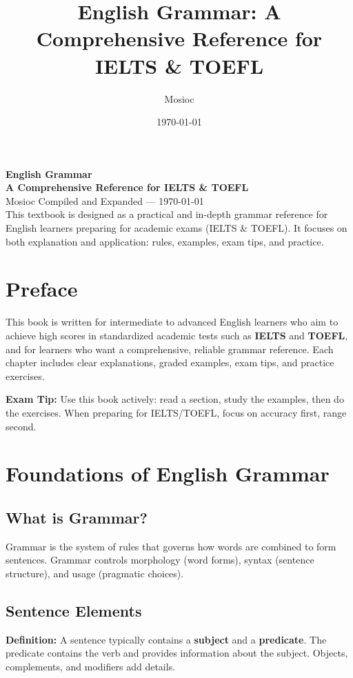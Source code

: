 \documentclass[12pt,oneside]{book}
\title{English Grammar: A Comprehensive Reference for IELTS \& TOEFL}
\author{Mosioc}
\date{\today}
\newcommand{\tip}[1]{\begin{examptip}\textbf{Exam Tip:} #1\end{examptip}}
\newcommand{\defbox}[1]{\begin{definitionbox}\textbf{Definition:} #1\end{definitionbox}}
\begin{document}
\begin{titlepage}
  \centering
  \vspace*{3cm}
  {\Huge\bfseries English Grammar}\vspace{0.5cm} \\
  {\Large\bfseries A Comprehensive Reference for IELTS \& TOEFL}\\[1.5cm]
  {\Large Mosioc}\vfill
  {\large Compiled and Expanded — \today}\\[1cm]
  \vfill
  \normalsize This textbook is designed as a practical and in-depth grammar reference for English learners preparing for academic exams (IELTS \& TOEFL). It focuses on both explanation and application: rules, examples, exam tips, and practice.
\end{titlepage}

\frontmatter
\tableofcontents
\mainmatter

\chapter*{Preface}
This book is written for intermediate to advanced English learners who aim to achieve high scores in standardized academic tests such as \textbf{IELTS} and \textbf{TOEFL}, and for learners who want a comprehensive, reliable grammar reference. Each chapter includes clear explanations, graded examples, exam tips, and practice exercises.

\tip{Use this book actively: read a section, study the examples, then do the exercises. When preparing for IELTS/TOEFL, focus on accuracy first, range second.}

\chapter{Foundations of English Grammar}
\section{What is Grammar?}
Grammar is the system of rules that governs how words are combined to form sentences. Grammar controls morphology (word forms), syntax (sentence structure), and usage (pragmatic choices).

\section{Sentence Elements}
\defbox{A sentence typically contains a \textbf{subject} and a \textbf{predicate}. The predicate contains the verb and provides information about the subject. Objects, complements, and modifiers add details.}
\end{document}
